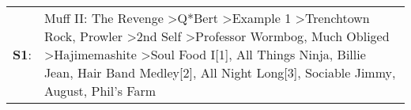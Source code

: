 \begin{supertabular}{p{0.03\textwidth}p{0.92\textwidth}}
 \textbf{S1}:  &  Muff II: The Revenge\textsuperscript{} \textgreater \enspace Q*Bert\textsuperscript{} \textgreater \enspace Example 1\textsuperscript{} \textgreater \enspace Trenchtown Rock\textsuperscript{}, \enspace Prowler\textsuperscript{} \textgreater \enspace 2nd Self\textsuperscript{} \textgreater \enspace Professor Wormbog\textsuperscript{}, \enspace Much Obliged\textsuperscript{} \textgreater \enspace Hajimemashite\textsuperscript{} \textgreater \enspace Soul Food I[1]\textsuperscript{}, \enspace All Things Ninja\textsuperscript{}, \enspace Billie Jean\textsuperscript{}, \enspace Hair Band Medley[2]\textsuperscript{}, \enspace All Night Long[3]\textsuperscript{}, \enspace Sociable Jimmy\textsuperscript{}, \enspace August\textsuperscript{}, \enspace Phil's Farm\textsuperscript{}  \enspace  \\
\end{supertabular}
